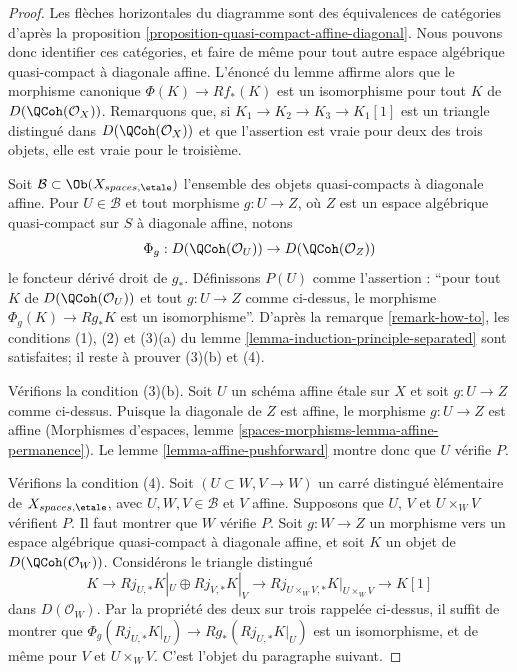 \begin{proof}
Les fl\`eches horizontales du diagramme sont des \'equivalences de cat\'egories
d'apr\`es la proposition
\ref{proposition-quasi-compact-affine-diagonal}. Nous pouvons donc identifier
ces cat\'egories, et faire de m\^eme pour tout autre espace alg\'ebrique
quasi-compact \`a diagonale affine. L'\'enonc\'e du lemme affirme alors que le
morphisme canonique $\Phi(K) \to Rf_*(K)$ est un isomorphisme pour tout
$K$ de $D(\QCoh(\mathcal{O}_X))$. Remarquons que, si
$K_1 \to K_2 \to K_3 \to K_1[1]$ est un triangle distingu\'e dans
$D(\QCoh(\mathcal{O}_X))$ et que l'assertion est vraie pour deux des trois
objets, elle est vraie pour le troisi\`eme.

\medskip\noindent
Soit $\mathcal{B} \subset \Ob(X_{spaces, \etale})$ l'ensemble des objets
quasi-compacts \`a diagonale affine. Pour $U \in \mathcal{B}$ et tout
morphisme $g : U \to Z$, o\`u $Z$ est un espace alg\'ebrique quasi-compact
sur $S$ \`a diagonale affine, notons
$$
\Phi_g : D(\QCoh(\mathcal{O}_U)) \to D(\QCoh(\mathcal{O}_Z))
$$
le foncteur d\'eriv\'e droit de $g_*$. D\'efinissons $P(U)$ comme l'assertion :
``pour tout $K$ de $D(\QCoh(\mathcal{O}_U))$ et tout $g : U \to Z$ comme
ci-dessus, le morphisme $\Phi_g(K) \to Rg_*K$ est un isomorphisme''.
D'apr\`es la remarque \ref{remark-how-to}, les conditions (1), (2) et (3)(a)
du lemme \ref{lemma-induction-principle-separated} sont satisfaites; il reste
\`a prouver (3)(b) et (4).

\medskip\noindent
V\'erifions la condition (3)(b). Soit $U$ un sch\'ema affine \'etale sur $X$
et soit $g : U \to Z$ comme ci-dessus. Puisque la diagonale de $Z$ est
affine, le morphisme $g : U \to Z$ est affine (Morphismes d'espaces, lemme
\ref{spaces-morphisms-lemma-affine-permanence}).
Le lemme \ref{lemma-affine-pushforward} montre donc que $U$ v\'erifie $P$.

\medskip\noindent
V\'erifions la condition (4). Soit $(U \subset W, V \to W)$ un carr\'e
distingu\'e \`el\'ementaire de $X_{spaces, \etale}$, avec
$U,W,V \in \mathcal{B}$ et $V$ affine. Supposons que $U$, $V$ et
$U \times_W V$ v\'erifient $P$. Il faut montrer que $W$ v\'erifie $P$.
Soit $g : W \to Z$ un morphisme vers un espace alg\'ebrique quasi-compact
\`a diagonale affine, et soit $K$ un objet de
$D(\QCoh(\mathcal{O}_W))$. Consid\'erons le triangle distingu\'e
$$
K \to Rj_{U, *}K|_U \oplus Rj_{V, *}K|_V \to
Rj_{U \times_W V, *}K|_{U \times_W V} \to K[1]
$$
dans $D(\mathcal{O}_W)$. Par la propri\'et\'e des deux sur trois rappel\'ee
ci-dessus, il suffit de montrer que
$\Phi_g(Rj_{U, *}K|_U) \to Rg_*(Rj_{U, *}K|_U)$ est un isomorphisme, et de
m\^eme pour $V$ et $U \times_W V$. C'est l'objet du paragraphe suivant.


\end{proof}
